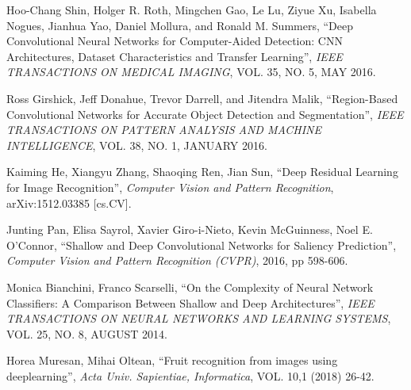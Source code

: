 \documentclass[conference]{IEEEtran}
\begin{document}
\begin{thebibliography}{1}
	Hoo-Chang Shin, Holger R. Roth, Mingchen Gao, Le Lu, Ziyue Xu, Isabella Nogues, Jianhua Yao, Daniel Mollura, and Ronald M. Summers, ``Deep Convolutional Neural Networks for Computer-Aided Detection: CNN Architectures, Dataset Characteristics and Transfer Learning'', {\em IEEE TRANSACTIONS ON MEDICAL IMAGING}, VOL. 35, NO. 5, MAY 2016.
	
	Ross Girshick, Jeff Donahue, Trevor Darrell, and Jitendra Malik, ``Region-Based Convolutional Networks for Accurate Object Detection and Segmentation'', {\em IEEE TRANSACTIONS ON PATTERN ANALYSIS AND MACHINE INTELLIGENCE}, VOL. 38, NO. 1, JANUARY 2016.
	
	Kaiming He, Xiangyu Zhang, Shaoqing Ren, Jian Sun, ``Deep Residual Learning for Image Recognition'', {\em Computer Vision and Pattern Recognition}, arXiv:1512.03385 [cs.CV].
	
	Junting Pan, Elisa Sayrol, Xavier Giro-i-Nieto, Kevin McGuinness, Noel E. O'Connor, ``Shallow and Deep Convolutional Networks for Saliency Prediction'', {\em Computer Vision and Pattern Recognition (CVPR)},  2016, pp 598-606.
	
	Monica Bianchini, Franco Scarselli, ``On the Complexity of Neural Network Classifiers: A Comparison Between Shallow and Deep Architectures'', {\em IEEE TRANSACTIONS ON NEURAL NETWORKS AND LEARNING SYSTEMS}, VOL. 25, NO. 8, AUGUST 2014.
	
	Horea Muresan, Mihai Oltean, ``Fruit recognition from images using deeplearning'', {\em Acta Univ. Sapientiae, Informatica}, VOL. 10,1 (2018) 26-42.
	
	
	
	
	
	
	
\end{thebibliography}





\end{document}
